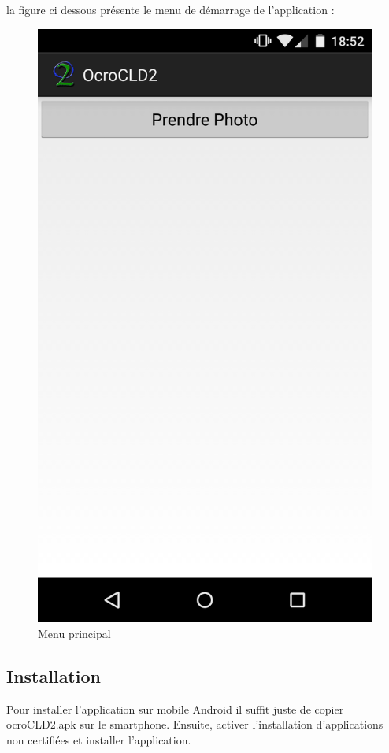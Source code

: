 la figure ci dessous présente le menu de démarrage de l'application : 
	\begin{figure}[H]
		\centering
		\includegraphics[scale=0.1]{images/appliMenu.png}
		\caption{Menu principal}
		\label{fig:image}
	\end{figure}

\subsection{Installation}
Pour installer l'application sur mobile Android il suffit juste de copier ocroCLD2.apk sur le smartphone. Ensuite, activer l'installation d'applications non certifiées et installer l'application.

